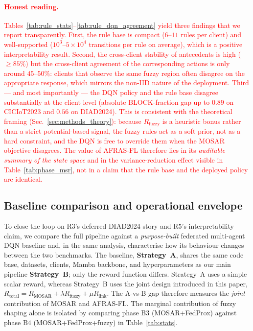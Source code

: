 \documentclass[journal]{IEEEtran}
\newcommand{\rev}[1]{\textcolor{red}{#1}}
\begin{document}
\rev{\paragraph{Honest reading.}
Tables~\ref{tab:rule_stats}--\ref{tab:rule_dqn_agreement} yield three
findings that we report transparently. First, the rule base is
compact ($6$--$11$ rules per client) and well-supported ($10^{3}$--$5{\times}10^{4}$
transitions per rule on average), which is a positive interpretability
result. Second, the cross-client stability of antecedents is high
($\geq 85\%$) but the cross-client agreement of the corresponding
actions is only around $45$--$50\%$: clients that observe the same
fuzzy region often disagree on the appropriate response, which
mirrors the non-IID nature of the deployment. Third --- and most
importantly --- the DQN policy and the rule base disagree
substantially at the client level (absolute BLOCK-fraction gap up to
$0.89$ on CICIoT2023 and $0.56$ on DIAD2024). This is consistent
with the theoretical framing (Sec.~\ref{sec:methods_theory}): because
$R_{\text{fuzzy}}$ is a heuristic bonus rather than a strict
potential-based signal, the fuzzy rules act as a soft prior, not as
a hard constraint, and the DQN is free to override them when the
MOSAR objective disagrees. The value of AFRAS-FL therefore lies in
its \emph{auditable summary of the state space} and in the
variance-reduction effect visible in Table~\ref{tab:phase_msr}, not
in a claim that the rule base and the deployed policy are identical.}

\subsection{Baseline comparison and operational envelope}\label{sec:r6_envelope}

To close the loop on R3's deferred DIAD2024 story and R5's
interpretability claim, we compare the full pipeline against a
\emph{purpose-built} federated multi-agent DQN baseline and, in the
same analysis, characterise how its behaviour changes between the
two benchmarks. The baseline, \textbf{Strategy~A}, shares the same
code base, datasets, clients, Mamba backbone, and hyperparameters
as our main pipeline \textbf{Strategy~B}; only the reward function
differs. Strategy~A uses a simple scalar reward, whereas Strategy~B
uses the joint design introduced in this paper, $R_{\text{total}} =
R_{\text{MOSAR}} + \lambda R_{\text{fuzzy}} + \mu R_{\text{link}}$. The
A-vs-B gap therefore measures the \emph{joint} contribution of MOSAR
and AFRAS-FL. The marginal contribution of fuzzy shaping alone is
isolated by comparing phase B3 (MOSAR+FedProx) against phase B4
(MOSAR+FedProx+fuzzy) in Table~\ref{tab:stats}.
\end{document}
